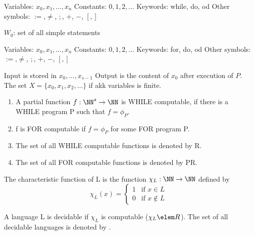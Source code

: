 
        Variables: $x_0, x_1, \ldots, x_n$\newline
        Constants: $0, 1, 2, \ldots$\newline
        Keywords: while, do, od\newline
        Other symbols: $:=$,$\neq$, $;$, $+$, $-$, $[,]$\newline

        $W_0$: set of all simple statements\newline

        Variables: $x_0, x_1, \ldots, x_n$\newline
        Constants: $0, 1, 2, \ldots$\newline
        Keywords: for, do, od\newline
        Other symbols: $:=$,$\neq$, $;$, $+$, $-$, $[,]$\newline
    
        Input is stored in $x_0, \ldots, x_{s-1}$
        Output is the content of $x_0$ after execution of $P$.\newline
        The set $X = \{ x_0, x_1, x_2, \ldots \}$ if akk variables is finite.\newline

        \begin{enumerate}
            \item A partial function $f: \NN^s \rightarrow \NN$ is WHILE computable, if there is
            a WHILE program P such that $f = \phi_P$.
            \item f is FOR computable if $f = \phi_P$ for some FOR program P.
            \item The set of all WHILE computable functions is denoted by R.
            \item The set of all FOR computable functions is denoted by PR.
        \end{enumerate}

        The characteristic function of L is the function $\chi_L: \NN \rightarrow \NN$ defined by
        \begin{equation}
            \chi_L(x) = \begin{cases}
                1 & \text{if } x \in L \\
                0 & \text{if } x \notin L
            \end{cases}
        \end{equation}

        A language L is decidable if $\chi_L$ is computable ($\chi_L \elem R$).\newline
        The set of all decidable languages is denoted by \REC.\newline